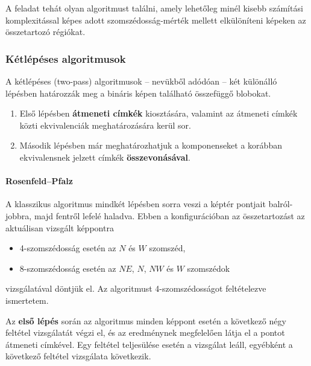 \bigskip

A feladat tehát olyan algoritmust találni, amely lehetőleg minél kisebb számítási komplexitással képes adott szomszédosság-mérték mellett elkülöníteni képeken az összetartozó régiókat.

\subsubsection{Kétlépéses algoritmusok}\label{sect:blob_ketlepes}

A kétlépéses (two-pass) algoritmusok -- nevükből adódóan -- két különálló lépésben határozzák meg a bináris képen található összefüggő blobokat.

\begin{enumerate}
  \item Első lépésben \textbf{átmeneti címkék} kiosztására, valamint az átmeneti címkék közti ekvivalenciák meghatározására kerül sor.
  \item Második lépésben már meghatározhatjuk a komponenseket a korábban ekvivalensnek jelzett címkék \textbf{összevonásával}.
\end{enumerate}


\paragraph{Rosenfeld--Pfalz}

A klasszikus algoritmus \cite{rosenfeld} mindkét lépésben sorra veszi a képtér pontjait balról-jobbra, majd fentről lefelé haladva. Ebben a konfigurációban az összetartozást az aktuálisan vizsgált képpontra

\begin{itemize}
  \item 4-szomszédosság esetén az $N$ és $W$ szomszéd,
  \item 8-szomszédosság esetén az $NE$, $N$, $NW$ és $W$ szomszédok
\end{itemize}

vizsgálatával döntjük el. Az algoritmust 4-szomszédosságot feltételezve ismertetem.

\bigskip

Az \textbf{első lépés} során az algoritmus minden képpont esetén a következő négy feltétel vizsgálatát végzi el, és az eredménynek megfelelően látja el a pontot átmeneti címkével. Egy feltétel teljesülése esetén a vizsgálat leáll, egyébként a következő feltétel vizsgálata következik.

